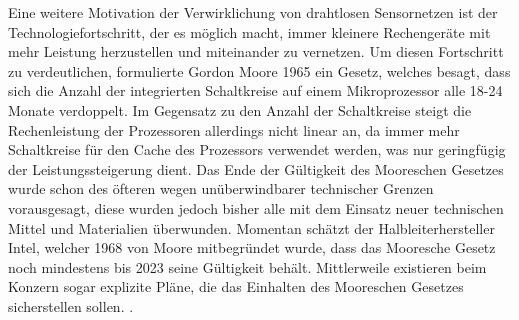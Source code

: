 Eine weitere Motivation der Verwirklichung von drahtlosen Sensornetzen ist der Technologiefortschritt, der es möglich macht, immer kleinere Rechengeräte mit mehr Leistung herzustellen und miteinander zu vernetzen. Um diesen Fortschritt zu verdeutlichen, formulierte Gordon Moore 1965 ein Gesetz, welches besagt, dass sich die Anzahl der integrierten Schaltkreise auf einem Mikroprozessor alle 18-24 Monate verdoppelt. Im Gegensatz zu den Anzahl der Schaltkreise steigt die Rechenleistung der Prozessoren allerdings nicht linear an, da immer mehr Schaltkreise für den Cache des Prozessors verwendet werden, was nur geringfügig der Leistungssteigerung dient. Das Ende der Gültigkeit des Mooreschen Gesetzes wurde schon des öfteren wegen unüberwindbarer technischer Grenzen vorausgesagt, diese wurden jedoch bisher alle mit dem Einsatz neuer technischen Mittel und Materialien überwunden. Momentan schätzt der Halbleiterhersteller Intel, welcher 1968 von Moore mitbegründet wurde, dass das Mooresche Gesetz noch mindestens bis 2023 seine Gültigkeit behält. Mittlerweile existieren beim Konzern sogar explizite Pläne, die das Einhalten des Mooreschen Gesetzes sicherstellen sollen.  \cite{d:wolf} \cite{ws:kahle} \cite{ws:tuomi}. \\

